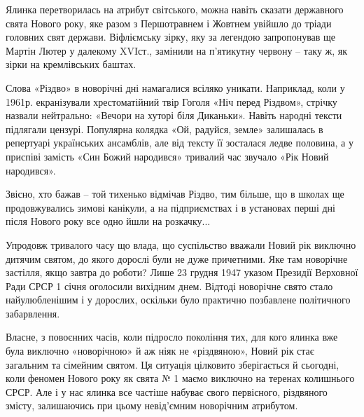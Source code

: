 Ялинка перетворилась на атрибут світського, можна навіть сказати державного
свята Нового року, яке разом з Першотравнем і Жовтнем увійшло до тріади
головних свят держави. Віфліємську зірку, яку за легендою запропонував ще
Мартін Лютер у далекому XVIст., замінили на п’ятикутну червону – таку ж, як
зірки на кремлівських баштах. 

Слова «Різдво» в новорічні дні намагалися всіляко уникати. Наприклад, коли у
1961р. екранізували хрестоматійний твір Гоголя «Ніч перед Різдвом», стрічку
назвали нейтрально: «Вечори на хуторі біля Диканьки». Навіть народні тексти
підлягали цензурі. Популярна колядка «Ой, радуйся, земле» залишалась в
репертуарі українських ансамблів, але від тексту її зосталася ледве половина, а
у приспіві замість «Син Божий народився» тривалий час звучало «Рік Новий
народився». 

Звісно, хто бажав – той тихенько відмічав Різдво, тим більше, що в школах ще
продовжувались зимові канікули, а на підприємствах і в установах перші дні
після Нового року все одно йшли на розкачку...

Упродовж тривалого часу що влада, що суспільство вважали Новий рік виключно
дитячим святом, до якого дорослі були не дуже причетними. Яке там новорічне
застілля, якщо завтра до роботи? Лише 23 грудня 1947 указом Президії Верховної
Ради СРСР 1 січня оголосили вихідним днем. Відтоді новорічне свято стало
найулюбленішим і у дорослих, оскільки було практично позбавлене політичного
забарвлення.

Власне, з повоєнних часів, коли підросло покоління тих, для кого  ялинка вже
була виключно «новорічною» й аж ніяк не «різдвяною», Новий рік стає загальним
та сімейним святом. Ця ситуація цілковито зберігається й сьогодні, коли феномен
Нового року як свята № 1 маємо виключно на теренах колишнього СРСР. Але і у нас
ялинка все частіше набуває свого первісного, різдвяного змісту, залишаючись при
цьому невід’ємним новорічним атрибутом.

